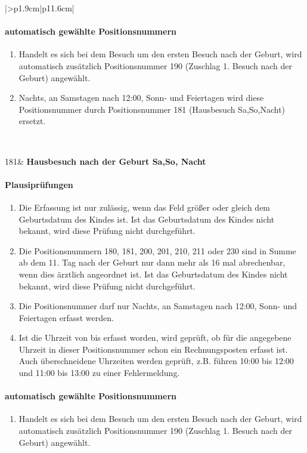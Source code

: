 \begin{mpsupertabular}{|>{\centering}p{1.9cm}|p{11.6cm}|}
\paragraph{automatisch gewählte Positionsnummern}
\begin{enumerate}
\item
Handelt es sich bei dem Besuch um den ersten Besuch nach der Geburt,
wird automatisch zusätzlich Positionsnummer 190 (Zuschlag 1. Besuch 
nach der Geburt) angewählt. 
\item
Nachts, an Samstagen nach 12:00, Sonn- und Feiertagen wird diese 
Positionsnummer durch Positionsnummer
181 (Hausbesuch Sa,So,Nacht) ersetzt.
\end{enumerate}
\\ \hline




181&
\textbf{Hausbesuch nach der Geburt Sa,So, Nacht}
\paragraph{Plausiprüfungen}
\begin{enumerate}
\item
Die Erfassung ist nur zulässig, wenn das Feld  größer 
oder gleich dem Geburtsdatum des Kindes ist. Ist das Geburtsdatum des
Kindes nicht bekannt, wird diese Prüfung nicht durchgeführt.
\item
Die Positionsnummern 180, 181, 200, 201, 210, 211 oder 230 sind in Summe 
ab dem 11. Tag nach der Geburt nur dann mehr 
als 16 mal abrechenbar, wenn dies ärztlich angeordnet ist.
Ist das Geburtsdatum des
Kindes nicht bekannt, wird diese Prüfung nicht durchgeführt.
\item
Die Positionsnummer darf nur Nachts, an Samstagen nach 12:00, 
Sonn- und Feiertagen erfasst werden.
\item
Ist die Uhrzeit von bis erfasst worden, wird geprüft, ob für die angegebene 
Uhrzeit in dieser Positionsnummer
schon ein Rechnungsposten erfasst ist. Auch überschneidene Uhrzeiten
werden geprüft, z.B. führen 10:00 bis 12:00 und 11:00 bis 13:00 zu einer
Fehlermeldung.
\end{enumerate}
\paragraph{automatisch gewählte Positionsnummern}
\begin{enumerate}
\item
Handelt es sich bei dem Besuch um den ersten Besuch nach der Geburt,
wird automatisch zusätzlich Positionsnummer 190 (Zuschlag 1. Besuch 
nach der Geburt) angewählt. 
\end{enumerate}
\\ \hline



\end{mpsupertabular}
